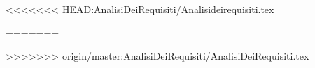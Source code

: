 \newcommand{\lastversion}{0.1.0}%
\newcommand{\doctitle}{Analisi dei requisiti}%
\newcommand{\info}{\doctitle\ v\lastversion}



<<<<<<< HEAD:AnalisiDeiRequisiti/Analisideirequisiti.tex



=======

%
%
>>>>>>> origin/master:AnalisiDeiRequisiti/AnalisiDeiRequisiti.tex


